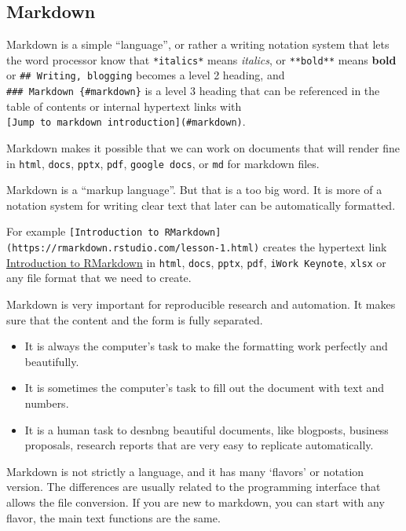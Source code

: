 \documentclass[
  fontsize=13pt,
  english,
  a4paper,
  openany, a4paper, oneside]{book}
\begin{document}
\hypertarget{markdown}{%
\subsection{Markdown}\label{markdown}}

Markdown is a simple ``language'', or rather a writing notation system that lets the word processor know that \texttt{*italics*} means \emph{italics}, or \texttt{**bold**} means \textbf{bold} or \texttt{\#\#\ Writing,\ blogging} becomes a level 2 heading, and \texttt{\#\#\#\ Markdown\ \{\#markdown\}} is a level 3 heading that can be referenced in the table of contents or internal hypertext links with \texttt{{[}Jump\ to\ markdown\ introduction{]}(\#markdown)}.

Markdown makes it possible that we can work on documents that will render fine in \texttt{html}, \texttt{docs}, \texttt{pptx}, \texttt{pdf}, \texttt{google\ docs}, or \texttt{md} for markdown files.

Markdown is a ``markup language''. But that is a too big word. It is more of a notation system for writing clear text that later can be automatically formatted.

For example \texttt{{[}Introduction\ to\ RMarkdown{]}(https://rmarkdown.rstudio.com/lesson-1.html)} creates the hypertext link \href{https://rmarkdown.rstudio.com/lesson-1.html}{Introduction to RMarkdown} in \texttt{html}, \texttt{docs}, \texttt{pptx}, \texttt{pdf}, \texttt{iWork\ Keynote}, \texttt{xlsx} or any file format that we need to create.

Markdown is very important for reproducible research and automation. It makes sure that the content and the form is fully separated.

\begin{itemize}
\item
  It is always the computer's task to make the formatting work perfectly and beautifully.
\item
  It is sometimes the computer's task to fill out the document with text and numbers.
\item
  It is a human task to desnbng beautiful documents, like blogposts, business proposals, research reports that are very easy to replicate automatically.
\end{itemize}

Markdown is not strictly a language, and it has many `flavors' or notation version. The differences are usually related to the programming interface that allows the file conversion. If you are new to markdown, you can start with any flavor, the main text functions are the same.
\end{document}

